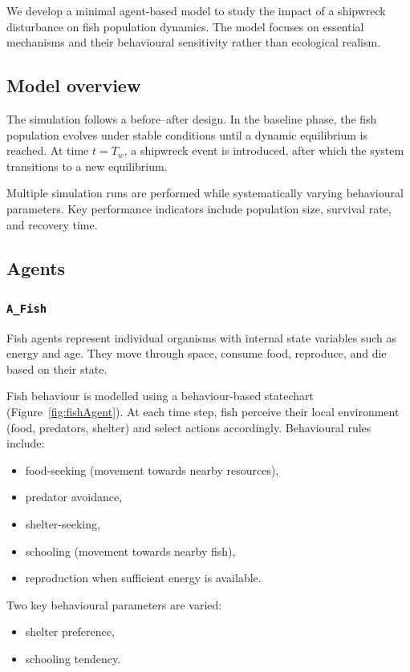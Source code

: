 \documentclass[10pt,a4paper,twocolumn]{article}
\begin{document}
We develop a minimal agent-based model to study the impact of a shipwreck disturbance on fish population dynamics. The model focuses on essential mechanisms and their behavioural sensitivity rather than ecological realism.

\subsection{Model overview}

The simulation follows a before–after design. In the baseline phase, the fish population evolves under stable conditions until a dynamic equilibrium is reached. At time $t = T_w$, a shipwreck event is introduced, after which the system transitions to a new equilibrium.

Multiple simulation runs are performed while systematically varying behavioural parameters. Key performance indicators include population size, survival rate, and recovery time.

\subsection{Agents}

\subsubsection{\texttt{A\_Fish}}

Fish agents represent individual organisms with internal state variables such as energy and age. They move through space, consume food, reproduce, and die based on their state.

Fish behaviour is modelled using a behaviour-based statechart (Figure~\ref{fig:fishAgent}). At each time step, fish perceive their local environment (food, predators, shelter) and select actions accordingly. Behavioural rules include:
\begin{itemize}
    \item food-seeking (movement towards nearby resources),
    \item predator avoidance,
    \item shelter-seeking,
    \item schooling (movement towards nearby fish),
    \item reproduction when sufficient energy is available.
\end{itemize}

Two key behavioural parameters are varied:
\begin{itemize}
    \item shelter preference,
    \item schooling tendency.
\end{itemize}
\end{document}
